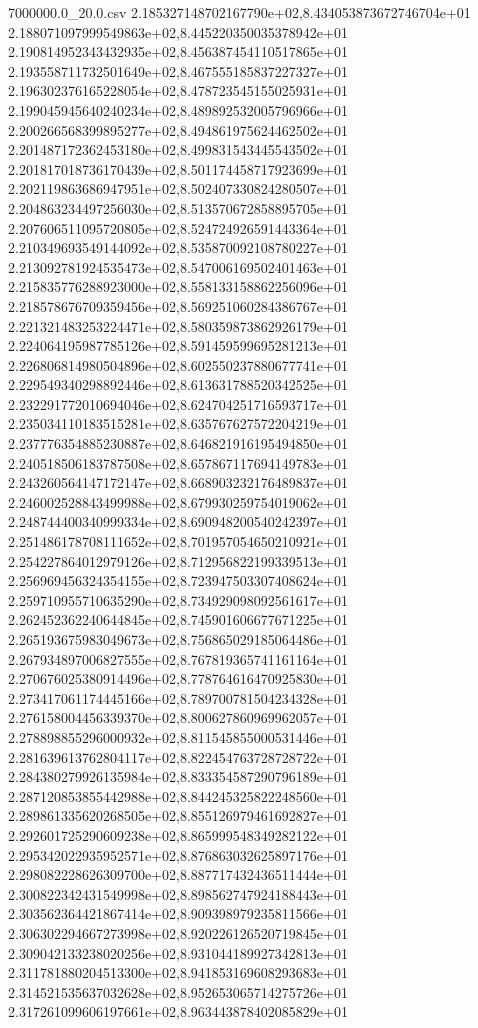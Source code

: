 \begin{filecontents*}{7000000.0_20.0.csv}
2.185327148702167790e+02,8.434053873672746704e+01
2.188071097999549863e+02,8.445220350035378942e+01
2.190814952343432935e+02,8.456387454110517865e+01
2.193558711732501649e+02,8.467555185837227327e+01
2.196302376165228054e+02,8.478723545155025931e+01
2.199045945640240234e+02,8.489892532005796966e+01
2.200266568399895277e+02,8.494861975624462502e+01
2.201487172362453180e+02,8.499831543445543502e+01
2.201817018736170439e+02,8.501174458717923699e+01
2.202119863686947951e+02,8.502407330824280507e+01
2.204863234497256030e+02,8.513570672858895705e+01
2.207606511095720805e+02,8.524724926591443364e+01
2.210349693549144092e+02,8.535870092108780227e+01
2.213092781924535473e+02,8.547006169502401463e+01
2.215835776288923000e+02,8.558133158862256096e+01
2.218578676709359456e+02,8.569251060284386767e+01
2.221321483253224471e+02,8.580359873862926179e+01
2.224064195987785126e+02,8.591459599695281213e+01
2.226806814980504896e+02,8.602550237880677741e+01
2.229549340298892446e+02,8.613631788520342525e+01
2.232291772010694046e+02,8.624704251716593717e+01
2.235034110183515281e+02,8.635767627572204219e+01
2.237776354885230887e+02,8.646821916195494850e+01
2.240518506183787508e+02,8.657867117694149783e+01
2.243260564147172147e+02,8.668903232176489837e+01
2.246002528843499988e+02,8.679930259754019062e+01
2.248744400340999334e+02,8.690948200540242397e+01
2.251486178708111652e+02,8.701957054650210921e+01
2.254227864012979126e+02,8.712956822199339513e+01
2.256969456324354155e+02,8.723947503307408624e+01
2.259710955710635290e+02,8.734929098092561617e+01
2.262452362240644845e+02,8.745901606677671225e+01
2.265193675983049673e+02,8.756865029185064486e+01
2.267934897006827555e+02,8.767819365741161164e+01
2.270676025380914496e+02,8.778764616470925830e+01
2.273417061174445166e+02,8.789700781504234328e+01
2.276158004456339370e+02,8.800627860969962057e+01
2.278898855296000932e+02,8.811545855000531446e+01
2.281639613762804117e+02,8.822454763728728722e+01
2.284380279926135984e+02,8.833354587290796189e+01
2.287120853855442988e+02,8.844245325822248560e+01
2.289861335620268505e+02,8.855126979461692827e+01
2.292601725290609238e+02,8.865999548349282122e+01
2.295342022935952571e+02,8.876863032625897176e+01
2.298082228626309700e+02,8.887717432436511444e+01
2.300822342431549998e+02,8.898562747924188443e+01
2.303562364421867414e+02,8.909398979235811566e+01
2.306302294667273998e+02,8.920226126520719845e+01
2.309042133238020256e+02,8.931044189927342813e+01
2.311781880204513300e+02,8.941853169608293683e+01
2.314521535637032628e+02,8.952653065714275726e+01
2.317261099606197661e+02,8.963443878402085829e+01

\end{filecontents*}
